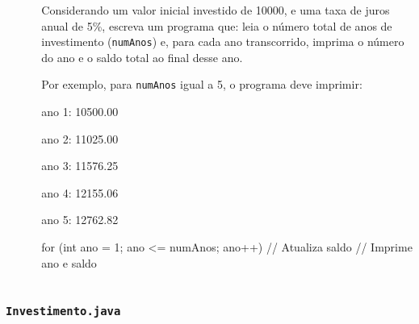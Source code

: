 \documentclass[xcolor={dvipsnames,table},aspectratio=169]{beamer}
\begin{document}
\begin{frame}[fragile]
\begin{columns}[T]
\begin{column}{0.3\linewidth}
\begin{figure}[h]
\end{figure}
	\end{column}
	\begin{column}{0.7\linewidth}
	\begin{itemize}
        {\footnotesize
		\item Considerando um valor inicial investido de 10000, e uma taxa de juros anual de 5\%, escreva um programa que: leia o número total de anos de investimento (\texttt{numAnos}) e, para cada ano transcorrido, imprima o número do ano e o saldo total ao final desse ano.
		\item Por exemplo, para \texttt{numAnos} igual a 5, o programa deve imprimir:
		}
		\begin{itemize}
            {\scriptsize
			\item ano 1: 10500.00
			\item ano 2: 11025.00
			\item ano 3: 11576.25
			\item ano 4: 12155.06
			\item ano 5: 12762.82\\
			}
		\end{itemize}
	\end{itemize}
{\scriptsize
\begin{javacode}
for (int ano = 1; ano <= numAnos; ano++) {
   // Atualiza saldo
   // Imprime ano e saldo
}
\end{javacode}
}
	\end{column}
\end{columns}
\end{frame}

\begin{frame}[fragile]\frametitle{\texttt{Investimento.java}}
\tiny{\inputminted[bgcolor=cyan!10]{java}{src/Investimento.java}}
\end{frame}
\end{document}
